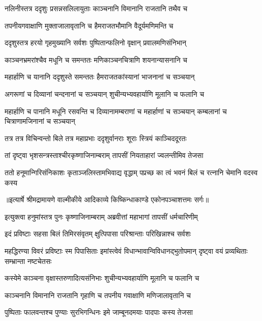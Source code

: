 \twolineshloka
{नलिनीस्तत्र ददृशुः प्रसन्नसलिलायुताः}
{काञ्चनानि विमानानि राजतानि तथैव च} %

\twolineshloka
{तपनीयगवाक्षाणि मुक्ताजालावृतानि च}
{हैमराजतभौमानि वैदूर्यमणिमन्ति च} %

\twolineshloka
{ददृशुस्तत्र हरयो गृहमुख्यानि सर्वशः}
{पुष्पितान्फलिनो वृक्षान् प्रवालमणिसंनिभान्} %

\twolineshloka
{काञ्चनभ्रमरांश्चैव मधूनि च समन्ततः}
{मणिकाञ्चनचित्राणि शयनान्यासनानि च} %

\twolineshloka
{महार्हाणि च यानानि ददृशुस्ते समन्ततः}
{हैमराजतकांस्यानां भाजनानां च सञ्चयान्} %

\twolineshloka
{अगरूणां च दिव्यानां चन्दनानां च सञ्चयान्}
{शुचीन्यभ्यवहार्याणि मूलानि च फलानि च} %

\threelineshloka
{महार्हाणि च पानानि मधूनि रसवन्ति च}
{दिव्यानामम्बराणां च महार्हाणां च सञ्चयान्}
{कम्बलानां च चित्राणामजिनानां च सञ्चयान्} %

\twolineshloka
{तत्र तत्र विचिन्वन्तो बिले तत्र महाप्रभाः}
{ददृशुर्वानराः शूराः स्त्रियं काञ्चिददूरतः} %

\twolineshloka
{तां दृष्ट्वा भृशसन्त्रस्ताश्चीरकृष्णाजिनाम्बराम्}
{तापसीं नियताहारां ज्वलन्तीमिव तेजसा} %

\fourlineindentedshloka
{ततो हनूमान्गिरिसंनिकाशः}
{कृताञ्जलिस्तामभिवाद्य वृद्धाम्}
{पप्रच्छ का त्वं भवनं बिलं च}
{रत्नानि चेमानि वदस्व कस्य} %


{॥इत्यार्षे श्रीमद्रामायणे वाल्मीकीये आदिकाव्ये किष्किन्धाकाण्डे एकोनपञ्चाशत्तमः सर्गः॥}


\twolineshloka
{इत्युक्त्वा हनुमांस्तत्र पुनः कृष्णाजिनाम्बराम्}
{अब्रवीत्तां महाभागां तापसीं धर्मचारिणीम्} %

\twolineshloka
{इदं प्रविष्टाः सहसा बिलं तिमिरसंवृतम्}
{क्षुत्पिपासा परिश्रान्ताः परिखिन्नाश्च सर्वशः} %

\threelineshloka
{महद्धिरण्या विवरं प्रविष्टाः स्म पिपासिताः}
{इमांस्त्वेवं विधान्भावान्विविधानद्भुतोपमान्}
{दृष्ट्वा वयं प्रव्यथिताः सम्भ्रान्ता नष्टचेतसः} %

\twolineshloka
{कस्येमे काञ्चना वृक्षास्तरुणादित्यसंनिभाः}
{शुचीन्यभ्यवहार्याणि मूलानि च फलानि च} %

\twolineshloka
{काञ्चनानि विमानानि राजतानि गृहाणि च}
{तपनीय गवाक्षाणि मणिजालावृतानि च} %

\twolineshloka
{पुष्पिताः फालवन्तश्च पुण्याः सुरभिगन्धिनः}
{इमे जाम्बूनदमयाः पादपाः कस्य तेजसा} %

